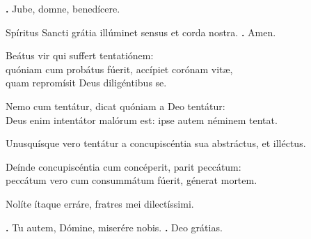 \begin{small}
\textbf{\Vbar.} Jube, domne, benedícere.

Spíritus Sancti grátia illúminet sensus et corda nostra.
\textbf{\Rbar.} Amen.
\end{small}


Beátus vir qui suffert tentatiónem: \\
quóniam cum probátus fúerit, accípiet corónam vitæ, \\
quam repromísit Deus diligéntibus se.

Nemo cum tentátur, dicat quóniam a Deo tentátur: \\
Deus enim intentátor malórum est: ipse autem néminem tentat.

Unusquísque vero tentátur a concupiscéntia sua abstráctus, et illéctus.

Deínde concupiscéntia cum concéperit, parit peccátum: \\
peccátum vero cum consummátum fúerit, génerat mortem.

Nolíte ítaque erráre, fratres mei dilectíssimi.

\textbf{\Vbar.} Tu autem, Dómine, miserére nobis.
\textbf{\Rbar.} Deo grátias.

